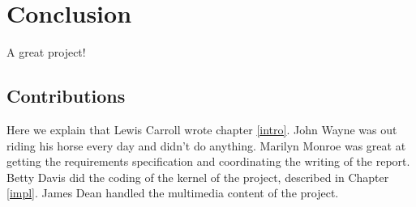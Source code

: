 \documentclass{l3proj}
\begin{document}
\chapter{Conclusion}

A great project!

\section{Contributions}

Here we explain that Lewis Carroll wrote chapter \ref{intro}. John Wayne
was out riding his horse every day and didn't do anything. Marilyn Monroe
was great at getting the requirements specification and coordinating the
writing of the report. Betty Davis did the coding of the kernel of the
project, described in Chapter \ref{impl}.  James Dean handled the
multimedia content of the project.



\end{document}
